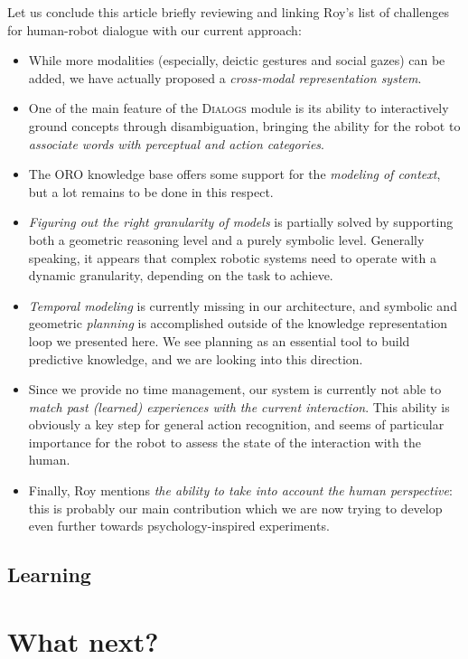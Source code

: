 Let us conclude this article briefly reviewing and linking Roy's list of challenges
for human-robot dialogue with our current approach: 
\begin{itemize}

	\item While more modalities (especially, deictic gestures and social gazes)
	can be added, we have actually proposed a \emph{cross-modal
	representation system}.

	\item One of the main feature of the \textsc{Dialogs} module is its ability
	to interactively ground concepts through disambiguation, bringing the
	ability for the robot to \emph{associate words with perceptual and action
	categories}.

	\item The ORO knowledge base offers some support for the \emph{modeling of
	context}, but a lot remains to be done in this respect.

	\item \emph{Figuring out the right granularity of models} is partially
	solved by supporting both a geometric reasoning level and a purely symbolic
	level. Generally speaking, it appears that complex robotic systems need
	to operate with a dynamic granularity, depending on the task to achieve.

	\item \emph{Temporal modeling} is currently missing in our architecture,
	and symbolic and geometric \emph{planning} is accomplished outside of the
	knowledge representation loop we presented here. We see planning as an
	essential tool to build predictive knowledge, and we are looking into this
	direction.

	\item Since we provide no time management, our system is currently not able
	to \emph{match past (learned) experiences with the current interaction}.
	This ability is obviously a key step for general action recognition, and
	seems of particular importance for the robot to assess the state of the
	interaction with the human.

	\item Finally, Roy mentions \emph{the ability to take into account the
	human perspective}: this is probably our main contribution which we are now
	trying to develop even further towards psychology-inspired experiments.

\end{itemize}

\subsection{Learning}
\label{sect|discussion-learning}

\section{What next?}
\label{sect|perspectives}


